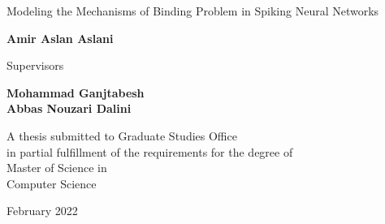 \documentclass[12pt]{report}
\begin{document}
\begin{latin}
		\begin{center}
			\huge{Modeling the Mechanisms of Binding Problem in Spiking Neural Networks}
		\end{center}
		
		\begin{center}
		\end{center}
		
		\begin{center}
			\textbf{
				Amir Aslan Aslani
				\\[30pt]
			}
		\end{center}
		
		
		\begin{center}
			Supervisors
		\end{center}
		\begin{center}
			\textbf{
				Mohammad Ganjtabesh
				\\[5pt]
				Abbas Nouzari Dalini
			}
		\end{center}
		
		
		\vspace{3cm}
		\begin{center}
			A thesis submitted to Graduate Studies Office\\
			in partial fulfillment of the requirements for the degree of \\
			Master of Science in\\
			Computer Science
		\end{center}
		
		\begin{center}
			February 2022
		\end{center}
		
		
	\end{latin}
	
\end{document}
